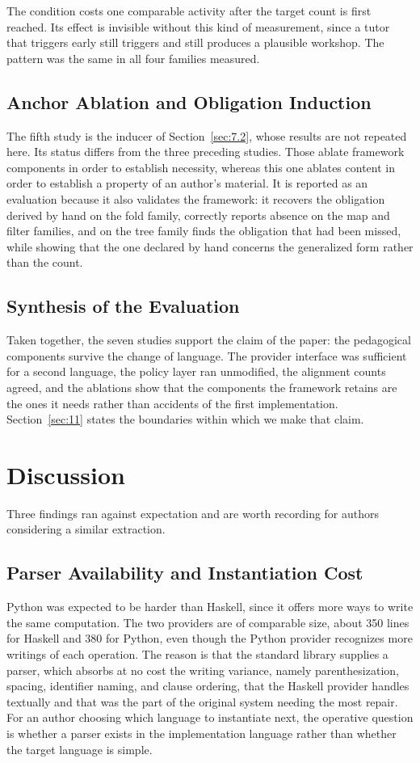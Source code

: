 \documentclass[journal]{IEEEtran}
\begin{document}
The condition costs one comparable activity after the target count is first reached. Its effect is invisible
without this kind of measurement, since a tutor that triggers early
still triggers and still produces a plausible workshop. The pattern was
the same in all four families measured.

\subsection{Anchor Ablation and Obligation Induction}\label{sec:8.7}
The fifth study is the inducer of Section~\ref{sec:7.2}, whose results are not
repeated here. Its status differs from the three preceding studies.
Those ablate framework components in order to establish necessity,
whereas this one ablates content in order to establish a property of an
author's material. It is reported as an evaluation because it also
validates the framework: it recovers the obligation derived by hand on
the fold family, correctly reports absence on the map and filter
families, and on the tree family finds the obligation that had been
missed, while showing that the one declared by hand concerns the
generalized form rather than the count.

\subsection{Synthesis of the Evaluation}\label{sec:8.8}
Taken together, the seven studies support the claim of the paper: the
pedagogical components survive the change of language. The provider
interface was sufficient for a second language, the policy layer ran
unmodified, the alignment counts agreed, and the ablations show that the
components the framework retains are the ones it needs rather than
accidents of the first implementation. Section~\ref{sec:11} states the boundaries
within which we make that claim.

\section{Discussion}\label{sec:9}
Three findings ran against expectation and are worth recording for
authors considering a similar extraction.

\subsection{Parser Availability and Instantiation Cost}\label{sec:9.1}
Python was expected to be harder than Haskell, since it offers more ways
to write the same computation. The two providers are of comparable size,
about 350 lines for Haskell and 380 for Python, even though the Python
provider recognizes more writings of each operation. The reason is that
the standard library
supplies a parser, which absorbs at no cost the writing variance, namely
parenthesization, spacing, identifier naming, and clause ordering, that
the Haskell provider handles textually and that was the part of the
original system needing the most repair. For an author choosing which
language to instantiate next, the operative question is whether a parser
exists in the implementation language rather than whether the target
language is simple.
\end{document}
